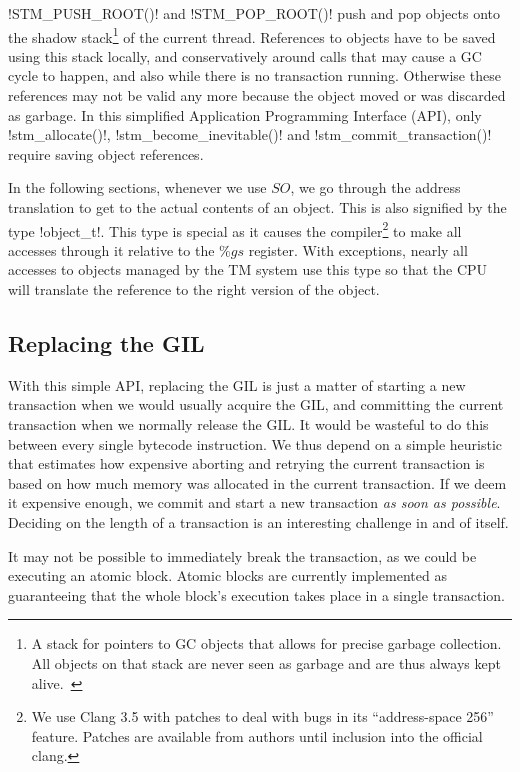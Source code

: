 \documentclass{sigplanconf}
\makeatletter
\renewcommand\lstinline[1][]{%
  \Collectverb{\@@myverb}%
}
\def\@@myverb#1{%
    \begingroup
    \fboxsep=0.2em
    \colorbox{verylightgray}{\oldlstinline|#1|}%
    \endgroup
}
\makeatother
\begin{document}
\lstinline!STM_PUSH_ROOT()! and \lstinline!STM_POP_ROOT()!
push and pop objects onto the shadow stack\footnote{A stack for pointers
  to GC objects that allows for precise garbage collection. All objects
  on that stack are never seen as garbage and are thus always kept
  alive.~\cite{fergus02}} of the current thread.  References to objects
have to be saved using this stack locally, and conservatively around calls that may cause a GC
cycle to happen, and also while there is no transaction
running. Otherwise these references may not be valid any more because
the object moved or was discarded as garbage. In this simplified Application
Programming Interface (API), only \lstinline!stm_allocate()!,
\lstinline!stm_become_inevitable()! and
\lstinline!stm_commit_transaction()!  require saving object
references.

In the following sections, whenever we use $SO$, we go through the
address translation to get to the actual contents of an object. This
is also signified by the type \lstinline!object_t!.  This type is
special as it causes the
compiler\footnote{We use Clang 3.5 with patches to deal with bugs in
its ``address-space 256'' feature. Patches are available from authors
until inclusion into the official clang.} to make all accesses through
it relative to the $\%gs$ register.  With exceptions, nearly all
accesses to objects managed by the TM system use this type so
that the CPU will translate the reference to the right version of the
object.
\medskip   %


\subsection{Replacing the GIL}

With this simple API, replacing the GIL is just a matter of starting a
new transaction when we would usually acquire the GIL, and committing
the current transaction when we normally release the GIL.  It would be
wasteful to do this between every single bytecode instruction.  We
thus depend on a simple heuristic that estimates how expensive
aborting and retrying the current transaction is based on how much
memory was allocated in the current transaction. If we deem it
expensive enough, we commit and start a new transaction \emph{as soon
as possible}. Deciding on the length of a transaction is an
interesting challenge in and of itself.

It may not be possible to immediately break the transaction, as we
could be executing an atomic block. Atomic blocks are currently
implemented as guaranteeing that the whole block's execution takes
place in a single transaction.
\end{document}
